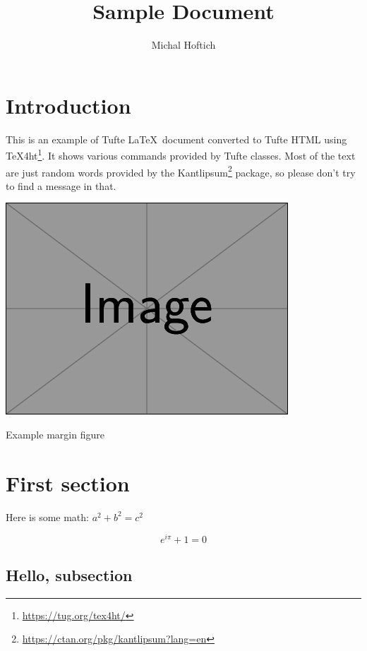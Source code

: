 \documentclass[]{tufte-book}
\begin{document}
\title{Sample Document}
\author{Michal Hoftich}
\maketitle
\tableofcontents
\section{Introduction}

This is an example of Tufte \LaTeX\ document converted to Tufte HTML using \TeX4ht\footnote{\url{https://tug.org/tex4ht/}}.
It shows various commands provided by Tufte classes. Most of the text are just random words 
provided by the Kantlipsum\footnote{\url{https://ctan.org/pkg/kantlipsum?lang=en}} package, so please don't 
try to find a message in that.



\begin{marginfigure}
  \includegraphics[width=\textwidth]{example-image.png}
  \caption{Example margin figure}
\end{marginfigure}

\section{First section}

Here is some math: \(a^2+b^2=c^2\)

\[e^{i\pi}+1=0\]

\kant[1]

\subsection{Hello, subsection}
\end{document}
